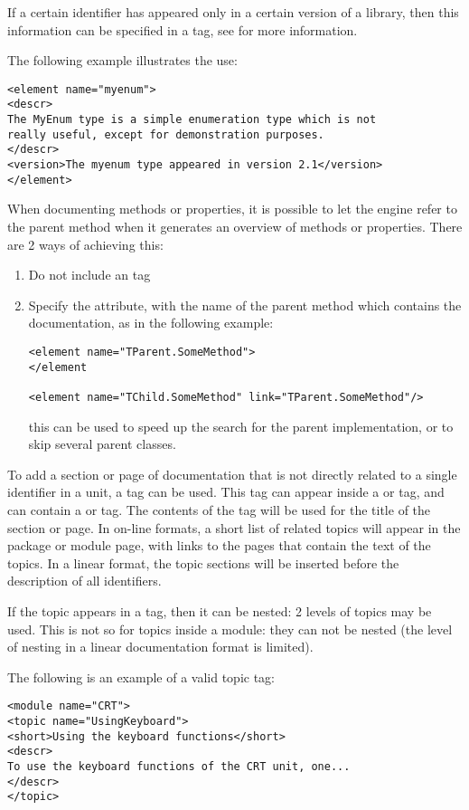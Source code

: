 If a certain identifier has appeared only in a certain version of a library,
then this information can be specified in a  tag, see
 for more information.

The following example illustrates the use:
\begin{verbatim}
<element name="myenum">
<descr>
The MyEnum type is a simple enumeration type which is not
really useful, except for demonstration purposes.
</descr>
<version>The myenum type appeared in version 2.1</version>
</element>
\end{verbatim}

When documenting methods or properties, it is possible to let the  engine
refer to the parent method when it generates an overview of methods or
properties. There are 2 ways of achieving this: 
\begin{enumerate}
\item Do not include an  tag
\item Specify the  attribute, with the name of the parent
method which contains the documentation, as in the following example:
\begin{verbatim}
<element name="TParent.SomeMethod">
</element

<element name="TChild.SomeMethod" link="TParent.SomeMethod"/>
\end{verbatim}
this can be used to speed up the search for the parent implementation,
or to skip several parent classes.
\end{enumerate}

To add a section or page of documentation that is not directly related to a
single identifier in a unit, a  tag can be used. This tag can
appear inside a  or  tag, and can contain a
 or  tag. The contents of the  tag will be
used for the title of the section or page. In on-line formats, a short list
of related topics will appear in the package or module page, with links to
the pages that contain the text of the topics. In a linear format, the topic
sections will be inserted before the description of all identifiers.

If the topic appears in a  tag, then it can be nested: 2 levels
of topics may be used. This is not so for topics inside a module: they can
not be nested (the level of nesting in a linear documentation format is limited).

The following is an example of a valid topic tag:
\begin{verbatim}
<module name="CRT">
<topic name="UsingKeyboard">
<short>Using the keyboard functions</short>
<descr>
To use the keyboard functions of the CRT unit, one...
</descr>
</topic>
\end{verbatim}

